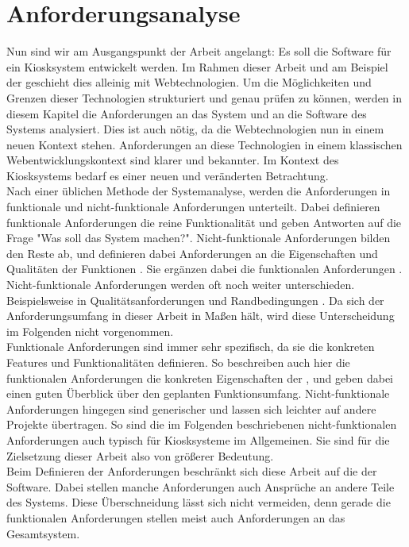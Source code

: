 \chapter{Anforderungsanalyse}
\label{chap:anforderungen}

Nun sind wir am Ausgangspunkt der Arbeit angelangt: Es soll die Software für ein Kiosksystem
entwickelt werden. Im Rahmen dieser Arbeit und am Beispiel der \shst{}
geschieht dies alleinig mit Webtechnologien. Um die Möglichkeiten und Grenzen dieser Technologien
strukturiert und genau prüfen zu können, werden in diesem Kapitel die Anforderungen an das System
und an die Software des Systems analysiert.
Dies ist auch nötig, da die Webtechnologien nun in einem neuen Kontext stehen. Anforderungen an diese
Technologien in einem klassischen Webentwicklungskontext sind klarer und bekannter. Im Kontext
des Kiosksystems bedarf es einer neuen und veränderten Betrachtung.\\

Nach einer üblichen Methode der Systemanalyse, werden die Anforderungen in funktionale und 
nicht-funktionale Anforderungen unterteilt. Dabei definieren funktionale Anforderungen die 
reine Funktionalität und geben Antworten 
auf die Frage "Was soll das System machen?". Nicht-funktionale Anforderungen bilden den Reste ab,
und definieren dabei Anforderungen an die Eigenschaften und Qualitäten der
Funktionen \cite{systemanalyse}. Sie ergänzen dabei die funktionalen 
Anforderungen \cite{systematisches}. Nicht-funktionale Anforderungen werden oft noch weiter unterschieden.
Beispielsweise in Qualitätsanforderungen und Randbedingungen \cite{systemanalyse,systematisches}.
Da sich der Anforderungsumfang in dieser Arbeit in Maßen hält, wird diese Unterscheidung im Folgenden
nicht vorgenommen.\\
Funktionale Anforderungen sind immer sehr spezifisch, da sie die konkreten Features
und Funktionalitäten definieren. So beschreiben auch hier die funktionalen Anforderungen die konkreten
Eigenschaften der \shst{}, und geben dabei einen guten Überblick über den geplanten Funktionsumfang.
Nicht-funktionale Anforderungen hingegen sind generischer und lassen sich leichter auf andere Projekte
übertragen. So sind die im Folgenden beschriebenen nicht-funktionalen Anforderungen auch typisch
für Kiosksysteme im Allgemeinen. Sie sind für die Zielsetzung dieser Arbeit also von 
größerer Bedeutung.\\
Beim Definieren der Anforderungen beschränkt sich diese Arbeit auf die der Software.
Dabei stellen manche Anforderungen auch Ansprüche an andere Teile des Systems. Diese Überschneidung
lässt sich nicht vermeiden, denn gerade die funktionalen Anforderungen stellen meist auch Anforderungen an das 
Gesamtsystem.\\ 


